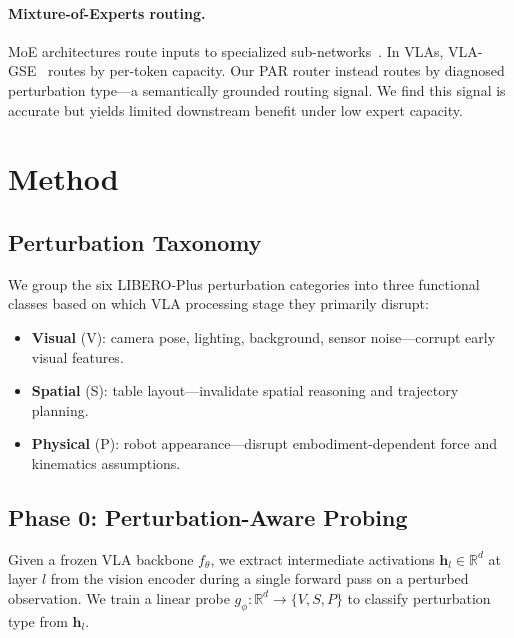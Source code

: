 \documentclass[letterpaper]{article}
\newcommand{\libeplus}{LIBERO-Plus}
\begin{document}
\paragraph{Mixture-of-Experts routing.}
MoE architectures route inputs to specialized sub-networks~\cite{shazeer2017outrageously,fedus2022switch}.
In VLAs, VLA-GSE~\cite{qu2025vlags} routes by per-token capacity.
Our PAR router instead routes by diagnosed perturbation type---a semantically grounded routing signal.
We find this signal is accurate but yields limited downstream benefit under low expert capacity.

\section{Method}
\label{sec:method}

\subsection{Perturbation Taxonomy}
\label{sec:taxonomy}

We group the six \libeplus{} perturbation categories into three functional classes based on which VLA processing stage they primarily disrupt:
\begin{itemize}
    \item \textbf{Visual} (V): camera pose, lighting, background, sensor noise---corrupt early visual features.
    \item \textbf{Spatial} (S): table layout---invalidate spatial reasoning and trajectory planning.
    \item \textbf{Physical} (P): robot appearance---disrupt embodiment-dependent force and kinematics assumptions.
\end{itemize}

\subsection{Phase 0: Perturbation-Aware Probing}
\label{sec:phase0}

Given a frozen VLA backbone $f_\theta$, we extract intermediate activations $\mathbf{h}_l \in \mathbb{R}^d$ at layer $l$ from the vision encoder during a single forward pass on a perturbed observation.
We train a linear probe $g_\phi: \mathbb{R}^d \to \{V, S, P\}$ to classify perturbation type from $\mathbf{h}_l$.
\end{document}
